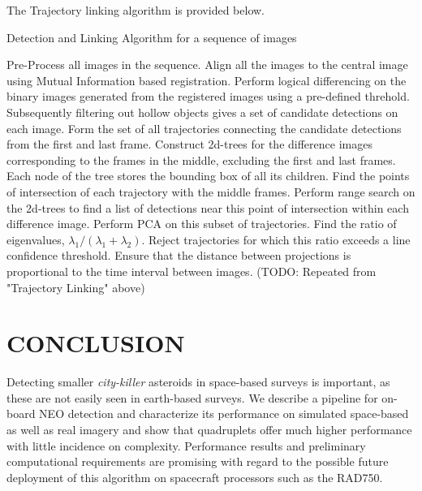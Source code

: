 \documentclass{article}
\begin{document}
The Trajectory linking algorithm is provided below.
\vspace{-0.1cm}
\begin{algorithm}[H]
\small
\caption{Detection and Linking Algorithm for a sequence of images}
\label{algo:Trajectory_Linking}
\begin{algorithmic}[1]
\State Pre-Process all images in the sequence.
\State Align all the images to the central image using Mutual Information based registration.
\State Perform logical differencing on the  binary images generated from the registered images using a pre-defined threhold. Subsequently filtering out hollow objects gives a set of candidate detections on each image. 
\State Form the set of all trajectories connecting the candidate detections from the first and last frame.
\State Construct 2d-trees for the difference images corresponding to the frames in the middle, excluding the first and last frames. Each node of the tree stores the bounding box of all its children.
\State Find the points of intersection of each trajectory with the middle frames.
\State Perform range search on the 2d-trees to find a list of detections near this point of intersection within each difference image. 
\State Perform PCA on this subset of trajectories. Find the ratio of eigenvalues, $\lambda_{1}/(\lambda_{1}+ \lambda_{2})$. Reject trajectories for which this ratio exceeds a line confidence threshold. Ensure that the distance between projections is proportional to the time interval between images. (TODO: Repeated from "Trajectory Linking" above)
\EndFor
\end{algorithmic}
\end{algorithm}
\vspace{-0.3cm}
\vspace{-0.3cm}


\vspace{-0.3cm}
\section{CONCLUSION}
Detecting smaller {\em city-killer} asteroids in space-based surveys is important, as these  are not easily seen in earth-based surveys. We describe a pipeline for on-board NEO detection and characterize its performance on simulated space-based as well as real imagery and show that quadruplets offer much higher performance with little incidence on complexity. Performance results and preliminary computational requirements are promising with regard to the possible future deployment of this algorithm on spacecraft processors such as the RAD750. 
\end{document}
